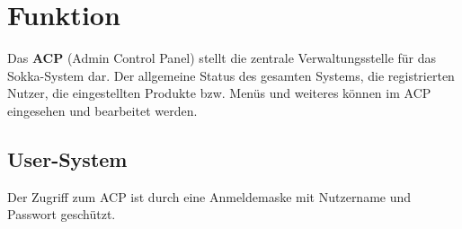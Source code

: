 \chapter{Funktion}

Das \textbf{ACP} (Admin Control Panel) stellt die zentrale Verwaltungsstelle für das Sokka-System dar. Der allgemeine Status des gesamten Systems, die registrierten Nutzer, die eingestellten Produkte bzw. Menüs und weiteres können im ACP eingesehen und bearbeitet werden.

\section{User-System}

Der Zugriff zum ACP ist durch eine Anmeldemaske mit Nutzername und Passwort geschützt.